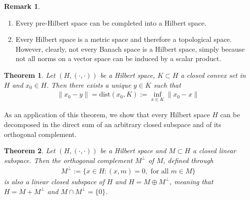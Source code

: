 \documentclass[11pt,a4paper]{article}
\newtheorem{thm}{Theorem}[section]
\theoremstyle{definition}
\newtheorem{rem}{Remark}[section]
\begin{document}
\begin{rem} \
\begin{enumerate} 
\item Every pre-Hilbert space can be completed into a Hilbert space. 
\item Every Hilbert space is a metric space and therefore a topological space. However, clearly, not every Banach space is a Hilbert space, simply because not all norms on a vector space can be induced by a scalar product. 
\end{enumerate}
\end{rem}
\begin{thm} Let $(H, ( \cdot, \cdot))$ be a Hilbert space, $K \subset H$ a closed convex set in $H$ and $x_0 \in H$. Then there exists a unique $y \in K$ such that 
\begin{align*}
\| x_0-y\| = \text{dist}(x_0,K):= \inf_{x \in K} \| x_0-x\|
\end{align*}
\end{thm}
\noindent As an application of this theorem, we show that every Hilbert space $H$  can be decomposed in the direct sum of an arbitrary closed subspace and of its orthogonal complement. 
\begin{thm} Let $(H, ( \cdot , \cdot))$ be a Hilbert space and $M \subset H$ a closed linear subspace. Then the orthogonal complement $M^\perp$ of $M$, defined through
\begin{align*}
M^\perp := \lbrace x \in H : (x,m)=0, \text{ for all } m \in M \rbrace 
\end{align*}
is also a linear closed subspace of $H$ and $H= M \oplus M^\perp$, meaning that $H=M+M^\perp$ and $M \cap M^\perp = \lbrace 0 \rbrace$. 
\end{thm}
\newpage
\end{document}

